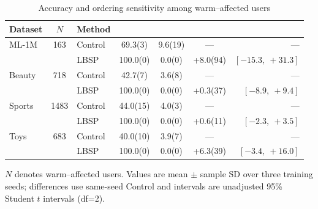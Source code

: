 \begin{table}[!htbp]
\centering
\caption{Accuracy and ordering sensitivity among warm--affected users}
\label{tab:x7-warm-stability}
\fontsize{8.5}{11}\selectfont
\setlength{\tabcolsep}{1.6pt}
\renewcommand{\arraystretch}{1.15}
\begin{tabular*}{\textwidth}{@{\extracolsep{\fill}}lS[table-format=4.0]lS[table-format=3.1(3)]S[table-format=2.1(3)]S[table-format=+2.1(3)]r@{}}
\toprule
Dataset & {$N$} & Method & {} & {} & {} & {}\\
\midrule
ML-1M & 163 & Control & 69.3(3) & 9.6(19) &  & ---\\ %
 &  & LBSP & 100.0(0) & 0.0(0) & +8.0(94) & \([-15.3,\ +31.3]\)\\ %
\midrule
Beauty & 718 & Control & 42.7(7) & 3.6(8) &  & ---\\ %
 &  & LBSP & 100.0(0) & 0.0(0) & +0.3(37) & \([-8.9,\ +9.4]\)\\ %
\midrule
Sports & 1483 & Control & 44.0(15) & 4.0(3) &  & ---\\ %
 &  & LBSP & 100.0(0) & 0.0(0) & +0.6(11) & \([-2.3,\ +3.5]\)\\ %
\midrule
Toys & 683 & Control & 40.0(10) & 3.9(7) &  & ---\\ %
 &  & LBSP & 100.0(0) & 0.0(0) & +6.3(39) & \([-3.4,\ +16.0]\)\\ %
\bottomrule
\end{tabular*}
\par\smallskip\noindent\begin{minipage}{\textwidth}\fontsize{8.5}{11}\selectfont $N$ denotes warm--affected users. Values are mean $\pm$ sample SD over three training seeds; differences use same-seed Control and intervals are unadjusted 95\% Student $t$ intervals (df=2).
\end{minipage}
\end{table}
